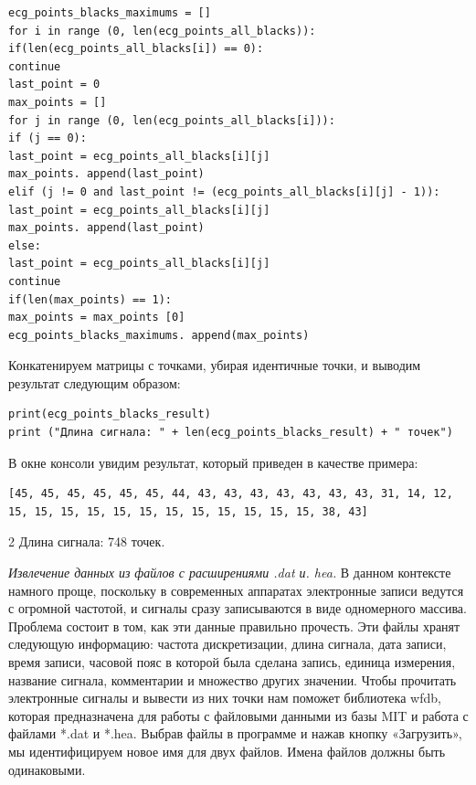 {\small
\begin{verbatim}
ecg_points_blacks_maximums = []
for i in range (0, len(ecg_points_all_blacks)):
if(len(ecg_points_all_blacks[i]) == 0):
continue
last_point = 0
max_points = []
for j in range (0, len(ecg_points_all_blacks[i])):
if (j == 0):
last_point = ecg_points_all_blacks[i][j]
max_points. append(last_point)
elif (j != 0 and last_point != (ecg_points_all_blacks[i][j] - 1)):
last_point = ecg_points_all_blacks[i][j]
max_points. append(last_point)
else:
last_point = ecg_points_all_blacks[i][j]
continue
if(len(max_points) == 1):
max_points = max_points [0]
ecg_points_blacks_maximums. append(max_points)
\end{verbatim}
}

Конкатенируем матрицы с точками, убирая идентичные точки, и выводим
результат следующим образом:

{\small
\begin{verbatim}
print(ecg_points_blacks_result)
print ("Длина сигнала: " + len(ecg_points_blacks_result) + " точек")
\end{verbatim}
}

В окне консоли увидим результат, который приведен в качестве примера:

{\small
\begin{verbatim}
[45, 45, 45, 45, 45, 45, 44, 43, 43, 43, 43, 43, 43, 43, 31, 14, 12, 
15, 15, 15, 15, 15, 15, 15, 15, 15, 15, 15, 15, 38, 43]
\end{verbatim}
}

\begin{multicols}{2}
Длина сигнала: 748 точек.

\emph{Извлечение данных из файлов с расширениями .dat и. hea.} В данном
контексте намного проще, поскольку в современных аппаратах электронные
записи ведутся с огромной частотой, и сигналы сразу записываются в виде
одномерного массива. Проблема состоит в том, как эти данные правильно
прочесть. Эти файлы хранят следующую информацию: частота дискретизации,
длина сигнала, дата записи, время записи, часовой пояс в которой была
сделана запись, единица измерения, название сигнала, комментарии и
множество других значении. Чтобы прочитать электронные сигналы и вывести
из них точки нам поможет библиотека wfdb, которая предназначена для
работы с файловыми данными из базы MIT и работа с файлами *.dat и *.hea.
Выбрав файлы в программе и нажав кнопку «Загрузить», мы идентифицируем
новое имя для двух файлов. Имена файлов должны быть одинаковыми.
\end{multicols}

